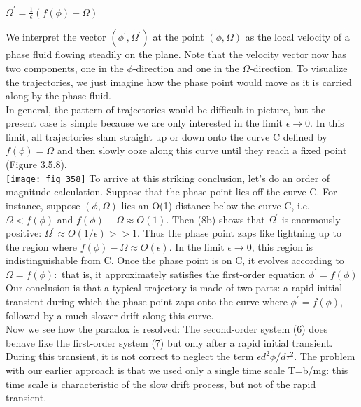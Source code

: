 \documentclass{article}
\newcommand\tab[1][1cm]{\hspace*{#1}}
\begin{document}
\begin{center}
$\Omega^{'}=\frac{1}{\epsilon}(f(\phi)-\Omega)$
\end{center}
We interpret the vector $(\phi^{'}, \Omega^{'})$ at the point $(\phi, \Omega)$ as the local velocity of a phase fluid flowing steadily on the plane. Note that the velocity vector now has two components, one in the $\phi$-direction and one in the $\Omega$-direction. To visualize the trajectories, we just imagine how the phase point would move as it is carried along by the phase fluid.
\\ \tab In general, the pattern of trajectories would be difficult in picture, but the present case is simple because we are only interested in the limit $\epsilon \to 0$. In this limit, all trajectories slam straight up or down onto the curve C defined by $f(\phi)=\Omega$ and then slowly ooze along this curve until they reach a fixed point (Figure 3.5.8). \\
\texttt{[image: fig\_358]}
To arrive at this striking conclusion, let's do an order of magnitude calculation. Suppose that the phase point lies off the curve C. For instance, suppose $(\phi, \Omega)$ lies an O(1) distance below the curve C, i.e. $\Omega<f(\phi)$ and $f(\phi)-\Omega \approx O(1)$. Then (8b) shows that $\Omega^{'}$ is enormously positive: $\Omega^{'} \approx O(1/\epsilon) >> 1$. Thus the phase point zaps like lightning up to the region where $f(\phi)-\Omega \approx O(\epsilon)$. In the limit $\epsilon \to 0$, this region is indistinguishable from C. Once the phase point is on C, it evolves according to $\Omega = f(\phi):$ that is, it approximately satisfies the first-order equation $\phi^{'}=f(\phi)$ \\
\tab Our conclusion is that a typical trajectory is made of two parts: a rapid initial transient during which the phase point zaps onto the curve where $\phi^{'}=f(\phi)$, followed by a much slower drift along this curve. \\
\tab Now we see how the paradox is resolved: The second-order system (6) does behave like the first-order system (7) but only after a rapid initial transient. During this transient, it is not correct to neglect the term $\epsilon d^{2}\phi / d \tau^{2}$. The problem with our earlier approach is that we used only a single time scale T=b/mg: this time scale is characteristic of the slow drift process, but not of the rapid transient.
\end{document}
